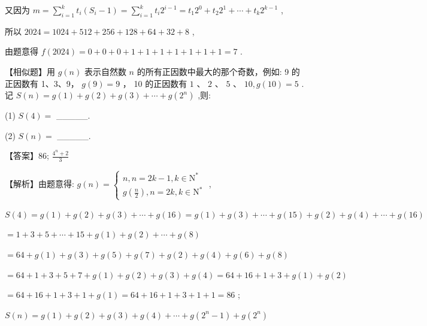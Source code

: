 \documentclass[10pt]{article}
\begin{document}
又因为 \(m = \mathop{\sum }\limits_{{i = 1}}^{k}{t}_{i}\left( {{S}_{i} - 1}\right)  = \mathop{\sum }\limits_{{i = 1}}^{k}{t}_{i}{2}^{i - 1} = {t}_{1}{2}^{0} + {t}_{2}{2}^{1} + \cdots  + {t}_{k}{2}^{k - 1}\) ,

所以 \({2024} = {1024} + {512} + {256} + {128} + {64} + {32} + 8\) ,

由题意得 \(f\left( {2024}\right)  = 0 + 0 + 0 + 1 + 1 + 1 + 1 + 1 + 1 + 1 = 7\) .

【相似题】用 \(g\left( n\right)\) 表示自然数 \(n\) 的所有正因数中最大的那个奇数，例如: 9 的正因数有 1、3、9， \(g\left( 9\right)  = 9\) ， 10 的正因数有 \(1\text{ 、 }2\text{ 、 }5\text{ 、 }{10},g\left( {10}\right)  = 5\) . 记 \(S\left( n\right)  = g\left( 1\right)  + g\left( 2\right)  + g\left( 3\right)  + \cdots  + g\left( {2}^{n}\right)\) ,则:

(1) \(S\left( 4\right)  =\) \_\_\_\_\_.

(2) \(S\left( n\right)  =\) \_\_\_\_\_.

【答案】86; \(\frac{{4}^{n} + 2}{3}\)

【解析】由题意得: \(g\left( n\right)  = \left\{  \begin{array}{l} n,n = {2k} - 1,k \in  {\mathrm{N}}^{ * } \\  g\left( \frac{n}{2}\right) ,n = {2k},k \in  {\mathrm{N}}^{ * } \end{array}\right.\) ,

\(S\left( 4\right)  = g\left( 1\right)  + g\left( 2\right)  + g\left( 3\right)  + \cdots  + g\left( {16}\right)  = g\left( 1\right)  + g\left( 3\right)  + \cdots  + g\left( {15}\right)  + g\left( 2\right)  + g\left( 4\right)  + \cdots  + g\left( {16}\right)\)

\(= 1 + 3 + 5 + \cdots  + {15} + g\left( 1\right)  + g\left( 2\right)  + \cdots  + g\left( 8\right)\)

\(= {64} + g\left( 1\right)  + g\left( 3\right)  + g\left( 5\right)  + g\left( 7\right)  + g\left( 2\right)  + g\left( 4\right)  + g\left( 6\right)  + g\left( 8\right)\)

\(= {64} + 1 + 3 + 5 + 7 + g\left( 1\right)  + g\left( 2\right)  + g\left( 3\right)  + g\left( 4\right)  = {64} + {16} + 1 + 3 + g\left( 1\right)  + g\left( 2\right)\)

\(= {64} + {16} + 1 + 3 + 1 + g\left( 1\right)  = {64} + {16} + 1 + 3 + 1 + 1 = {86}\) ;

\(S\left( n\right)  = g\left( 1\right)  + g\left( 2\right)  + g\left( 3\right)  + g\left( 4\right)  + \cdots  + g\left( {{2}^{n} - 1}\right)  + g\left( {2}^{n}\right)\)
\end{document}
